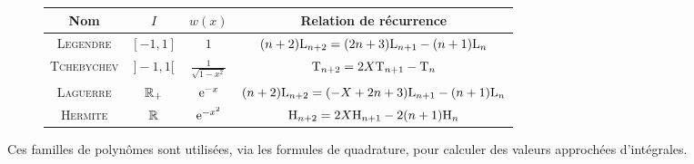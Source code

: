 \newpage

\begin{figure*}
    \begingroup
    \renewcommand{\arraystretch}{1.5} %
    \begin{tabular}{|c|c|c|c|}
        \hline
        Nom & $I$ & $w(x)$ & Relation de récurrence\\
        \hline \hline
        \textsc{Legendre} & $[-1, 1]$ & $1$ & $(n+2) \mathrm{L}_{n+2} = (2n+3) \mathrm{L}_{n+1} - (n+1)\mathrm{L}_n$\\
        \hline
        \textsc{Tchebychev} & $]-1, 1[$ & $\frac{1}{\sqrt{1-x^2}}$ & $\mathrm{T}_{n+2} = 2X \mathrm{T}_{n+1} - \mathrm{T}_n$ \\
        \hline
        \textsc{Laguerre} & $\mathbb{R}_+$ & $\mathrm{e}^{-x}$ & $(n+2) \mathrm{L}_{n+2} = (-X+2n+3) \mathrm{L}_{n+1} - (n+1) \mathrm{L}_n$ \\
        \hline
        \textsc{Hermite} & $\mathbb{R}$ & $\mathrm{e}^{-x^2}$ & $\mathrm{H}_{n+2} = 2X \mathrm{H}_{n+1} - 2(n+1) \mathrm{H}_n$\\
        \hline
    \end{tabular}
    \endgroup
\end{figure*}

Ces familles de polynômes sont utilisées, via les formules de quadrature, pour calculer des valeurs approchées d'intégrales.

